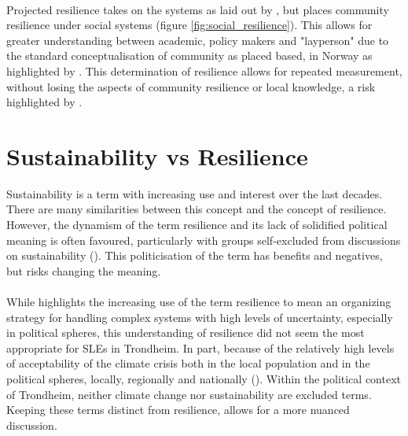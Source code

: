 \paragraph{}

Projected resilience takes on the systems as laid out by \cite{cutter_community_2020}, but places community resilience under social systems (figure \ref{fig:social_resilience}). This allows for greater understanding between academic, policy makers and "layperson" due to the standard conceptualisation of community as placed based, in Norway as highlighted by \cite{rasanen_conceptualizing_2020}. This determination of resilience allows for repeated measurement, without losing the aspects of community resilience or local knowledge, a risk highlighted by \cite{rasanen_conceptualizing_2020}.



\section{Sustainability vs Resilience}

Sustainability is a term with increasing use and interest over the last decades. There are many similarities between this concept and the concept of resilience. However, the dynamism of the term resilience and its lack of solidified political meaning is often favoured, particularly with groups self-excluded from discussions on sustainability (\cite{moser_turbulent_2019}). This politicisation of the term has benefits and negatives, but risks changing the meaning.
\paragraph{}

While \cite{moser_turbulent_2019} highlights the increasing use of the term resilience to mean an organizing strategy for handling complex systems with high levels of uncertainty, especially in political spheres, this understanding of resilience did not seem the most appropriate for SLEs in Trondheim. In part, because of the relatively high levels of acceptability of the climate crisis both in the local population and in the political spheres, locally, regionally and nationally (\cite{delebekk_faktasjekk_2023}). Within the political context of Trondheim, neither climate change nor sustainability are excluded terms. Keeping these terms distinct from resilience, allows for a more nuanced discussion.







